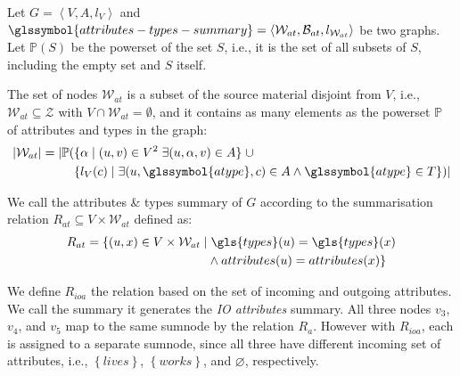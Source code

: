 \begin{definition}
	Let $G=\left\langle V, A, l_V \right\rangle$ and $\glssymbol{attributes-types-summary} = \left\langle \mathcal{W}_{at}, \mathcal{B}_{at}, l_{\mathcal{W}_{at}} \right\rangle$ be two graphs. Let $\mathbb{P}(S)$ be the powerset of the set $S$, i.e., it is the set of all subsets of $S$, including the empty set and $S$ itself.

	The set of nodes $\mathcal{W}_{at}$ is a subset of the source material disjoint from $V$, i.e., $\mathcal{W}_{at} \subseteq \mathcal{Z}$ with $V \cap \mathcal{W}_{at} = \emptyset$, and it contains as many elements as the powerset $\mathbb{P}$ of attributes and types in the graph:
	$$
	\begin{aligned}
	\lvert \mathcal{W}_{at} \rvert = \lvert \mathbb{P} ( & \{ \alpha \mid (u, v) \in V^2\; \exists (u, \alpha, v) \in A \} \;\cup \\
	& \{ l_V(c) \mid \exists (u, \glssymbol{atype}, c) \in A \wedge \glssymbol{atype} \in T \} ) \rvert
	\end{aligned}
	$$

	We call  the attributes \& types summary of $G$ according to the summarisation relation $R_{at} \subseteq V \times \mathcal{W}_{at}$ defined as:
	$$
	\begin{aligned}
		R_{at} = \{ (u, x) \in V \times \mathcal{W}_{at} \mid &\; \gls{types}(u) = \gls{types}(x) \\
	& \wedge attributes(u) = attributes(x) \}
	\end{aligned}
	$$
	\label{chap4:summary:def:attributes-types}
\end{definition}


We define $R_{ioa}$ the relation based on the set of incoming and outgoing \gls{attributes}. We call the summary it generates the \emph{IO attributes} summary.
All three nodes $v_3$, $v_4$, and $v_5$ map to the same sumnode by the relation $R_a$. However with $R_{ioa}$, each is assigned to a separate sumnode, since all three have different incoming set of attributes, i.e., $\left\lbrace lives \right\rbrace$, $\left\lbrace works \right\rbrace$, and $\varnothing$, respectively.

